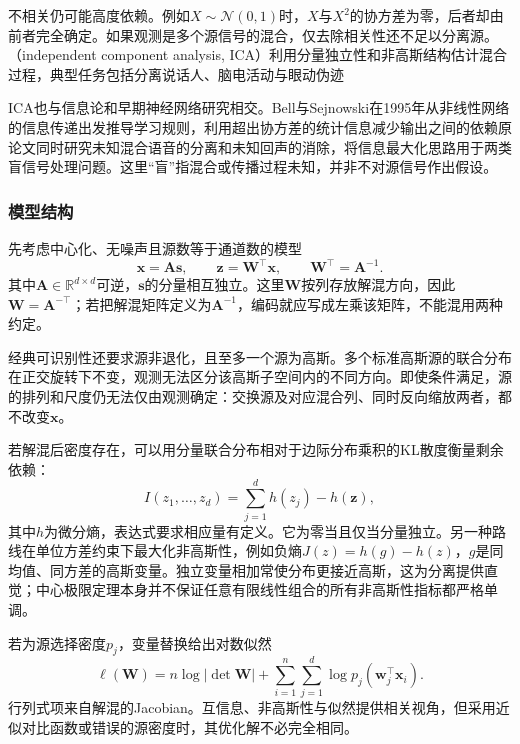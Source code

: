 不相关仍可能高度依赖。例如$X\sim\mathcal{N}(0,1)$时，$X$与$X^2$的协方差为零，后者却由前者完全确定。如果观测是多个源信号的混合，仅去除相关性还不足以分离源。（independent component analysis, ICA）利用分量独立性和非高斯结构估计混合过程，典型任务包括分离说话人、脑电活动与眼动伪迹

ICA也与信息论和早期神经网络研究相交。Bell与Sejnowski在1995年从非线性网络的信息传递出发推导学习规则，利用超出协方差的统计信息减少输出之间的依赖原论文同时研究未知混合语音的分离和未知回声的消除，将信息最大化思路用于两类盲信号处理问题。这里“盲”指混合或传播过程未知，并非不对源信号作出假设。

\subsubsection{模型结构}
\label{sec:dim-ica-structure}

先考虑中心化、无噪声且源数等于通道数的模型
\begin{equation}
  \bm{x}=\bm{A}\bm{s},\qquad
  \bm{z}=\bm{W}^{\top}\bm{x},\qquad
  \bm{W}^{\top}=\bm{A}^{-1}.
  \label{eq:dim-ica-model}
\end{equation}
其中$\bm{A}\in\mathbb{R}^{d\times d}$可逆，$\bm{s}$的分量相互独立。这里$\bm{W}$按列存放解混方向，因此$\bm{W}=\bm{A}^{-\top}$；若把解混矩阵定义为$\bm{A}^{-1}$，编码就应写成左乘该矩阵，不能混用两种约定。

经典可识别性还要求源非退化，且至多一个源为高斯。多个标准高斯源的联合分布在正交旋转下不变，观测无法区分该高斯子空间内的不同方向。即使条件满足，源的排列和尺度仍无法仅由观测确定：交换源及对应混合列、同时反向缩放两者，都不改变$\bm{x}$。

若解混后密度存在，可以用分量联合分布相对于边际分布乘积的KL散度衡量剩余依赖：
\[
  I(z_1,\ldots,z_d)
  =\sum_{j=1}^{d}h(z_j)-h(\bm{z}),
\]
其中$h$为微分熵，表达式要求相应量有定义。它为零当且仅当分量独立。另一种路线在单位方差约束下最大化非高斯性，例如负熵$J(z)=h(g)-h(z)$，$g$是同均值、同方差的高斯变量。独立变量相加常使分布更接近高斯，这为分离提供直觉；中心极限定理本身并不保证任意有限线性组合的所有非高斯性指标都严格单调。

若为源选择密度$p_j$，变量替换给出对数似然
\begin{equation}
  \ell(\bm{W})
  =n\log|\det\bm{W}|
   +\sum_{i=1}^{n}\sum_{j=1}^{d}
        \log p_j(\bm{w}_j^{\top}\bm{x}_i).
  \label{eq:dim-ica-likelihood}
\end{equation}
行列式项来自解混的Jacobian。互信息、非高斯性与似然提供相关视角，但采用近似对比函数或错误的源密度时，其优化解不必完全相同。

